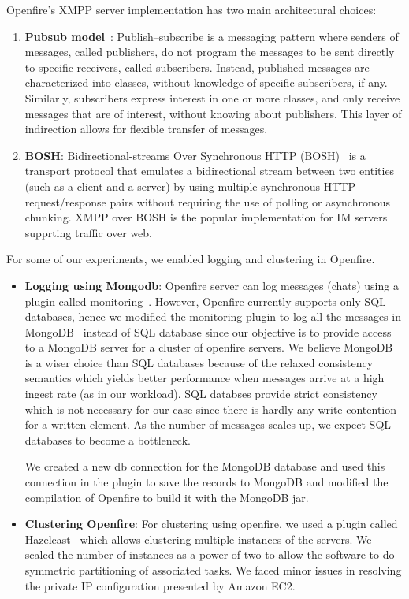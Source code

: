 \documentclass[a4paper, twocolumn]{article}
\begin{document}
Openfire's XMPP server implementation has two main architectural choices:
\begin{enumerate}
\item \textbf{Pubsub model}~\cite{pubsub}: Publish–subscribe is a messaging pattern where senders of messages, called publishers, do not program the messages to be sent directly to specific receivers, called subscribers. Instead, published messages are characterized into classes, without knowledge of specific subscribers, if any. Similarly, subscribers express interest in one or more classes, and only receive messages that are of interest, without knowing about publishers. This layer of indirection allows for flexible transfer of messages. 

\item \textbf{BOSH}: Bidirectional-streams Over Synchronous HTTP (BOSH)~\cite{bosh} is a transport protocol that emulates a bidirectional stream between two entities (such as a client and a server) by using multiple synchronous HTTP request/response pairs without requiring the use of polling or asynchronous chunking. XMPP over BOSH is the popular implementation for IM servers supprting traffic over web. 
\end{enumerate}
For some of our experiments, we enabled logging and clustering in Openfire. 
\begin{itemize}
\item \textbf{Logging using Mongodb}:
Openfire server can log messages (chats) using a plugin called monitoring~\cite{plugin_monitoring}. However, Openfire currently supports only SQL databases, hence we modified  the monitoring plugin to log  all the messages in MongoDB~\cite{mongodb} instead of SQL database since our objective is to provide access to a MongoDB server for a cluster of openfire servers. We believe MongoDB is a wiser choice than SQL databases because of the relaxed consistency semantics which yields better performance when messages arrive at a high ingest rate (as in our workload). SQL databses provide strict consistency which is not necessary for our case since there is hardly any write-contention for a written element. As the number of messages scales up, we expect SQL databases to become a bottleneck. 

We created a new db connection for the MongoDB database and used this connection in the plugin to save the records to MongoDB and modified the compilation of Openfire to build it with the MongoDB jar. 

\item \textbf{Clustering Openfire}: For clustering using openfire, we used  a plugin called Hazelcast~\cite{hazelcast} which allows clustering multiple instances of the servers. We scaled the number of instances as a power of two to allow the software to do symmetric partitioning of associated tasks. We faced minor issues in resolving the private IP configuration presented by Amazon EC2. 
\end{itemize}
\end{document}
